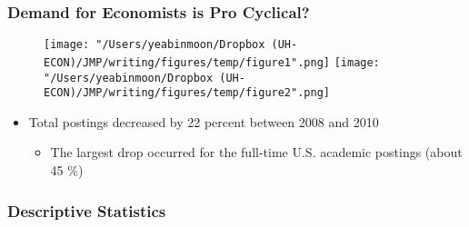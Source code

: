 \documentclass[11pt]{beamer}
\begin{document}
\begin{frame}
	\frametitle{Demand for Economists is Pro Cyclical?}

\begin{figure}
	\centering
\texttt{[image: "/Users/yeabinmoon/Dropbox (UH-ECON)/JMP/writing/figures/temp/figure1".png]} 
\texttt{[image: "/Users/yeabinmoon/Dropbox (UH-ECON)/JMP/writing/figures/temp/figure2".png]} 
\end{figure}
			
\begin{itemize}	
\item Total postings decreased by 22 percent between 2008 and 2010
\begin{itemize}
	\item The largest drop occurred for the full-time U.S. academic postings (about 45 \%)
\end{itemize}
\end{itemize}
\end{frame}



\begin{frame}
	\frametitle{Descriptive Statistics}
	
\end{frame}
\end{document}
